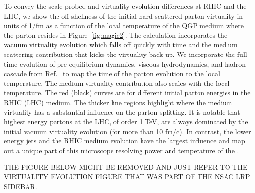 
To convey the scale probed and virtuality evolution differences at
RHIC and the LHC, we show the off-shellness of the initial hard
scattered parton virtuality in units of 1/fm as a function of the local temperature of
the QGP medium where the parton resides in Figure~\ref{fig:magic2}.  The calculation incorporates
the vacuum virtuality evolution which falls off quickly with time and
the medium scattering contribution that kicks the virtuality back up.
We incorporate the full time evolution of pre-equilibrium dynamics,
viscous hydrodynamics, and hadron cascade from
Ref.~\cite{Habich:2014jna} to map the time of the parton evolution to
the local temperature.  The medium virtuality contribution also scales
with the local temperature. The red (black) curves are for
different initial parton energies in the RHIC (LHC) medium.  The
thicker line regions highlight where the medium virtuality has a
substantial influence on the parton splitting.  It is notable that
highest energy partons at the LHC, of order 1 TeV, are always
dominated by the initial vacuum virtuality evolution (for more than 10
fm/c).  In contrast, the lower energy jets and the RHIC medium
evolution have the largest influence and map out a unique part of this
microscope resolving power and temperature of the \qgp.

THE FIGURE BELOW MIGHT BE REMOVED AND JUST REFER TO THE VIRTUALITY EVOLUTION FIGURE THAT WAS PART OF THE NSAC LRP SIDEBAR.

